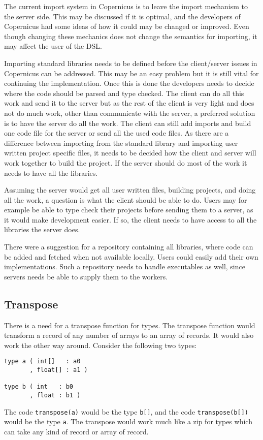 The current import system in Copernicus is to leave the import
mechanism to the server side. This may be discussed if it is optimal,
and the developers of Copernicus had some ideas of how it could may be
changed or improved. Even though changing these mechanics does not
change the semantics for importing, it may affect the user of the DSL.

Importing standard libraries needs to be defined before the
client/server issues in Copernicus can be addressed. This may be an
easy problem but it is still vital for continuing the
implementation. Once this is done the developers needs to decide where
the code should be parsed and type checked. The client can do all this
work and send it to the server but as the rest of the client is very
light and does not do much work, other than communicate with the
server, a preferred solution is to have the server do all the work. The
client can still add imports and build one code file for the server or
send all the used code files. As there are a difference between
importing from the standard library and importing user written project
specific files, it needs to be decided how the client and server will
work together to build the project. If the server should do most of
the work it needs to have all the libraries.

Assuming the server would get all user written files, building
projects, and doing all the work, a question is what the client should
be able to do. Users may for example be able to type check their
projects before sending them to a server, as it would make development
easier. If so, the client needs to have access to all the libraries
the server does.

There were a suggestion for a repository containing all libraries,
where code can be added and fetched when not available locally. Users
could easily add their own implementations. Such a repository needs to
handle executables as well, since servers needs be able to supply them
to the workers.


\subsection{Transpose}\label{sec:transpose}
There is a need for a transpose function for types. The transpose
function would transform a record of any number of arrays to an array
of records. It would also work the other way around. Consider the
following two types:

\begin{verbatim}
type a ( int[]   : a0
       , float[] : a1 )

type b ( int   : b0
       , float : b1 )
\end{verbatim}

The code \verb#transpose(a)# would be the type \verb#b[]#, and the
code \verb#transpose(b[])# would be the type \verb#a#. The transpose
would work much like a zip for types which can take any kind of record
or array of record.
